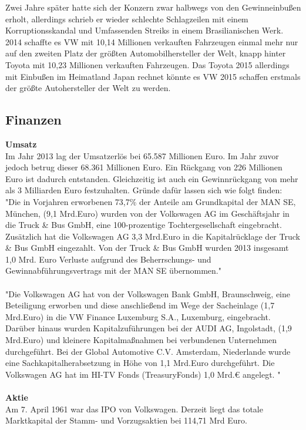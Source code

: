\documentclass[12pt]{article}
\begin{document}
Zwei Jahre später hatte sich der Konzern zwar halbwegs von den Gewinneinbußen erholt, allerdings schrieb er wieder schlechte Schlagzeilen mit einem Korruptionsskandal und Umfassenden Streiks in einem Brasilianischen Werk. \cite{autowp}\\
2014 schaffte es VW mit 10,14 Millionen verkauften Fahrzeugen einmal mehr nur auf den zweiten Platz der größten Automobilhersteller der Welt, knapp hinter Toyota mit 10,23 Millionen verkauften Fahrzeugen. Das Toyota 2015 allerdings mit Einbußen im Heimatland Japan rechnet könnte es VW 2015 schaffen erstmals der größte Autohersteller der Welt zu werden.

\subsection{Finanzen}
\textbf{Umsatz}\\
Im Jahr 2013 lag der Umsatzerlös bei 65.587 Millionen Euro. Im Jahr zuvor jedoch betrug dieser 68.361 Millionen Euro. Ein Rückgang von 226 Millionen Euro ist dadurch entstanden. Gleichzeitig ist auch ein Gewinnrückgang von mehr als 3 Milliarden Euro festzuhalten. Gründe dafür lassen sich wie folgt finden:
\\
"Die in Vorjahren erworbenen 73,7\% der Anteile am Grundkapital der MAN SE, München, (9,1 Mrd.Euro) wurden von
der Volkswagen AG im Geschäftsjahr in die Truck \& Bus GmbH, eine 100-prozentige Tochtergesellschaft eingebracht.
Zusätzlich hat die Volkswagen AG 3,3 Mrd.Euro in die Kapitalrücklage der Truck \& Bus GmbH eingezahlt. Von der Truck \&
Bus GmbH wurden 2013 insgesamt 1,0 Mrd. Euro Verluste aufgrund des Beherrschungs- und Gewinnabführungsvertrags
mit der MAN SE übernommen." \cite[Seite 3]{jbilanz2013vw}
\\\\
"Die Volkswagen AG hat von der Volkswagen Bank GmbH, Braunschweig, eine Beteiligung erworben und diese anschließend im Wege der Sacheinlage (1,7 Mrd.Euro) in die VW Finance Luxemburg S.A., Luxemburg, eingebracht.\\
Darüber hinaus wurden Kapitalzuführungen bei der AUDI AG, Ingolstadt, (1,9 Mrd.Euro) und kleinere Kapitalmaßnahmen bei verbundenen Unternehmen durchgeführt. Bei der Global Automotive C.V. Amsterdam, Niederlande
wurde eine Sachkapitalherabsetzung in Höhe von 1,1 Mrd.Euro durchgeführt. Die Volkswagen AG hat im HI-TV Fonds (TreasuryFonds) 1,0 Mrd.€ angelegt. "\cite[Seite 4]{jbilanz2013vw}
\\ \\ 
\textbf{Aktie} \\
Am 7. April 1961 war das IPO von Volkswagen. Derzeit liegt das totale Marktkapital der Stamm- und Vorzugsaktien bei 114,71 Mrd Euro. %
\end{document}
